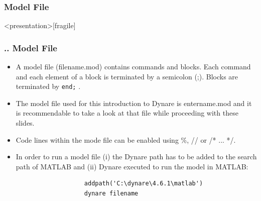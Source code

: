 \documentclass[11pt,aspectratio=169]{beamer}
\begin{document}
\subsubsection{Model File}
\begin{frame}<presentation>[fragile]
	\frametitle{{\thesection.\thesubsection.\thesubsubsection} Model File}
	\begin{itemize}
		\justifying
		\item A model file (filename.mod) contains commands and blocks. Each command and each element of a block is terminated by a semicolon (;). Blocks are terminated by \texttt{end;} .
		\item The model file used for this introduction to Dynare is entername.mod and it is recommendable to take a look at that file while proceeding with these slides. 
		\item Code lines within the mode file can be enabled using \%, // or /* ... */.
		\item In order to run a model file (i) the Dynare path has to be added to the search path of MATLAB and (ii) Dynare executed to run the model in MATLAB:
			\begin{verbatim}
				   addpath('C:\dynare\4.6.1\matlab')
				   dynare filename
			\end{verbatim}
	\end{itemize}
\end{frame}
\end{document}
